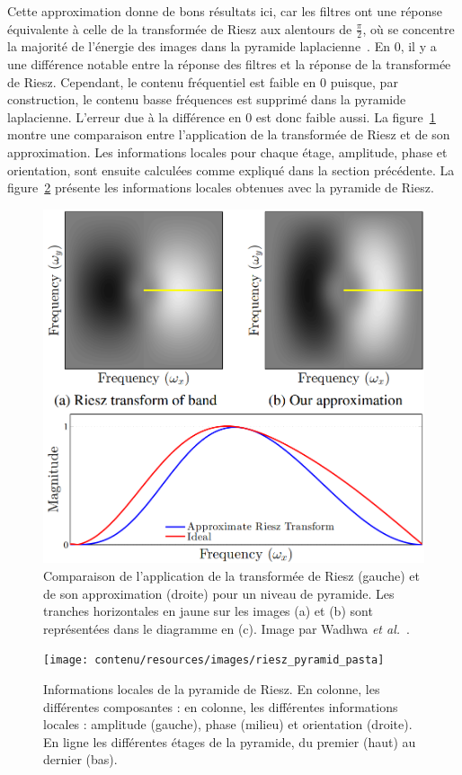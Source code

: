 Cette approximation donne de bons résultats ici, car les filtres ont une réponse équivalente à celle de la transformée de Riesz aux alentours de $\frac\pi2$, où se concentre la majorité de l'énergie des images dans la pyramide laplacienne~\cite{wadhwa_riesz_2014}. En $0$, il y a une différence notable entre la réponse des filtres et la réponse de la transformée de Riesz. Cependant, le contenu fréquentiel est faible en $0$ puisque, par construction, le contenu basse fréquences est supprimé dans la pyramide laplacienne. L'erreur due à la différence en $0$ est donc faible aussi. La figure~\ref{fig:riesz-approximation} montre une comparaison entre l'application de la transformée de Riesz et de son approximation. Les informations locales pour chaque étage, amplitude, phase et orientation, sont ensuite calculées comme expliqué dans la section précédente. La figure~\ref{fig:riesz-pyramid-local} présente les informations locales obtenues avec la pyramide de Riesz.

\bigskip

\begin{figure}[h]
    \centering
    \includegraphics[width=.65\textwidth]{contenu/resources/images/riesz_approximation}
    \caption[Approximation de la transformée de Riesz]{Comparaison de l'application de la transformée de Riesz (gauche) et de son approximation (droite) pour un niveau de pyramide. Les tranches horizontales en jaune sur les images (a) et (b) sont représentées dans le diagramme en (c). Image par Wadhwa \textit{et al.}~\cite{wadhwa_riesz_2014}.}
    \label{fig:riesz-approximation}
\end{figure}

\begin{figure}[hp]
    \centering
    \texttt{[image: contenu/resources/images/riesz\_pyramid\_pasta]}
    \caption[Informations locales de la pyramide de Riesz]{Informations locales de la pyramide de Riesz. En colonne, les différentes composantes : en colonne, les différentes informations locales : amplitude (gauche), phase (milieu) et orientation (droite). En ligne les différentes étages de la pyramide, du premier (haut) au dernier (bas).}
    \label{fig:riesz-pyramid-local}
\end{figure}

